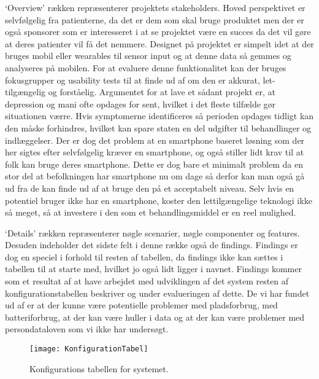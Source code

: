 `Overview' rækken repræsenterer projektets stakeholders. Hoved perspektivet er selvfølgelig fra patienterne, da det er dem som skal bruge produktet men der er også sponsorer som er interesseret i at se projektet være en succes da det vil gøre at deres patienter vil få det nemmere. 
Designet på projektet er simpelt idet at der bruges mobil eller wearables til sensor input og at denne data så gemmes og analyseres på mobilen. 
For at evaluere denne funktionalitet kan der bruges fokusgrupper og usability tests til at finde ud af om den er akkurat, let-tilgængelig og forståelig.
Argumentet for at lave et sådant projekt er, at depression og mani ofte opdages for sent, hvilket i det fleste tilfælde gør situationen værre.
Hvis symptomerne identificeres så perioden opdages tidligt kan den måske forhindres, hvilket kan spare staten en del udgifter til behandlinger og indlæggelser.
Der er dog det problem at en smartphone baseret løsning som der her sigtes efter selvfølgelig kræver en smartphone, og også stiller lidt krav til at folk kan bruge deres smartphone.
Dette er dog bare et minimalt problem da en stor del at befolkningen har smartphone nu om dage så derfor kan man også gå ud fra de kan finde ud af at bruge den på et acceptabelt niveau.
Selv hvis en potentiel bruger ikke har en smartphone, koster den lettilgængelige teknologi ikke så meget, så at investere i den som et behandlingsmiddel er en reel mulighed.

`Details' rækken repræsenterer nøgle scenarier, nøgle componenter og features.
Desuden indeholder det sidste felt i denne række også de findings.
Findings er dog en speciel i forhold til resten af tabellen, da findings ikke kan sættes i tabellen til at starte med, hvilket jo også lidt ligger i navnet.
Findings kommer som et resultat af at have arbejdet med udviklingen af det system resten af konfigurationstabellen beskriver og under evalueringen af dette. 
De vi har fundet ud af er at der kunne være potentielle problemer med pladsforbrug, med batteriforbrug, at der kan være huller i data og at der kan være problemer med persondataloven som vi ikke har undersøgt.

\begin{figure}
\texttt{[image: KonfigurationTabel]}
\caption{Konfigurations tabellen for systemet.}
\label{tab:konfigurationsTabel}
\end{figure}
